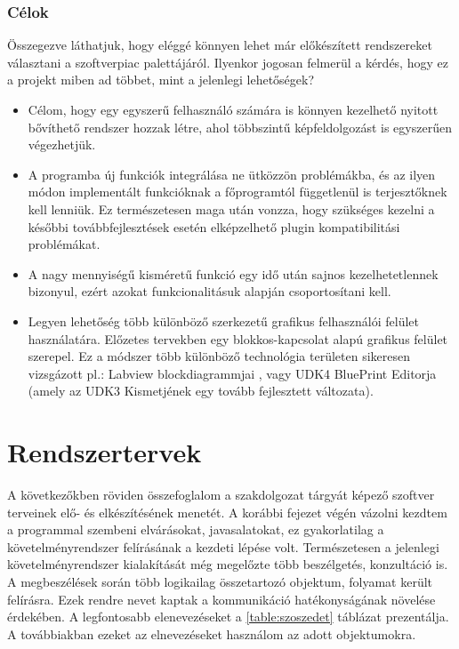 \documentclass[a4paper,12pt,oneside]{report}
\begin{document}
\subsubsection{Célok}
Összegezve láthatjuk, hogy eléggé könnyen lehet már előkészített rendszereket választani a szoftverpiac palettájáról. Ilyenkor jogosan felmerül a kérdés, hogy ez a projekt miben ad többet, mint a jelenlegi lehetőségek? 
\begin{itemize}
\item Célom, hogy egy egyszerű felhasználó számára is könnyen kezelhető nyitott bővíthető rendszer hozzak létre, ahol többszintű képfeldolgozást is egyszerűen végezhetjük.

\item A programba új funkciók integrálása ne ütközzön problémákba, és az ilyen módon implementált funkcióknak a főprogramtól függetlenül is terjesztőknek kell lenniük. Ez természetesen maga után vonzza, hogy szükséges kezelni a későbbi továbbfejlesztések esetén elképzelhető plugin kompatibilitási problémákat.

\item A nagy mennyiségű kisméretű funkció egy idő után sajnos kezelhetetlennek bizonyul, ezért azokat funkcionalitásuk alapján csoportosítani kell. 

\item Legyen lehetőség több különböző szerkezetű grafikus felhasználói felület használatára. Előzetes tervekben egy blokkos-kapcsolat alapú grafikus felület szerepel. Ez a módszer több különböző technológia területen sikeresen vizsgázott pl.: Labview blockdiagrammjai \cite{website:ni_blocks}, vagy UDK4 BluePrint Editorja\cite{website:udk_blueprint} (amely az UDK3 Kismetjének egy tovább fejlesztett változata).
\end{itemize}

\section{Rendszertervek}
A következőkben röviden összefoglalom a szakdolgozat tárgyát képező szoftver terveinek elő- és elkészítésének menetét. A korábbi fejezet végén vázolni kezdtem a programmal szembeni elvárásokat, javasalatokat, ez gyakorlatilag a követelményrendszer felírásának a kezdeti lépése volt. Természetesen a jelenlegi követelményrendszer kialakítását még megelőzte több beszélgetés, konzultáció is.\\
A megbeszélések során több logikailag összetartozó objektum, folyamat került felírásra. Ezek rendre nevet kaptak a kommunikáció hatékonyságának növelése érdekében. A legfontosabb elenevezéseket a \ref{table:szoszedet} táblázat prezentálja.\\ A továbbiakban ezeket az elnevezéseket használom az adott objektumokra.
\end{document}
